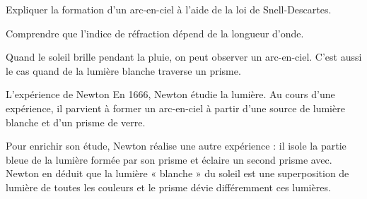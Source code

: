 \teteSndLumi
\vspace*{-30pt}



\begin{objectifs}
  \item Expliquer la formation d'un arc-en-ciel à l'aide de la loi de Snell-Descartes.
  \item Comprendre que l'indice de réfraction dépend de la longueur d'onde.
\end{objectifs}

\begin{contexte}
  Quand le soleil brille pendant la pluie, on peut observer un arc-en-ciel.
  C'est aussi le cas quand de la lumière blanche traverse un prisme.
  
\end{contexte}


\begin{doc}{L'expérience de Newton}
  En 1666, Newton étudie la lumière.
  Au cours d'une expérience, il parvient à former un arc-en-ciel à partir d'une source de lumière blanche et d'un prisme de verre.
 
  Pour enrichir son étude, Newton réalise une autre expérience : il isole la partie bleue de la lumière formée par son prisme et éclaire un second prisme avec.
  Newton en déduit que la lumière « blanche » du soleil est une superposition de lumière de toutes les couleurs et le prisme dévie différemment ces lumières.
  
  \vspace*{-8pt}
  \begin{center}
  \end{center}
\end{doc}

